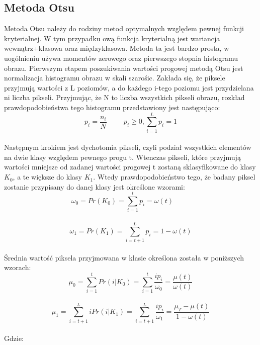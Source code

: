 \documentclass[eng,oneside]{mgr}
\begin{document}
\subsection{Metoda Otsu}
Metoda Otsu należy do rodziny metod optymalnych względem pewnej funkcji kryterialnej. W tym przypadku ową funkcja kryterialną jest wariancja wewnątrz+klasowa oraz międzyklasowa. Metoda ta jest bardzo prosta, w uogólnieniu używa momentów zerowego oraz pierwszego stopnia histogramu obrazu.
Pierwszym etapem poszukiwania wartości progowej metodą Otsu jest normalizacja histogramu obrazu w skali szarośic. Zakłada się, że piksele przyjmują wartości z L poziomów, a do każdego i-tego poziomu jest przydzielana ni liczba pikseli. Przyjmując, że N to liczba wszystkich pikseli obrazu, rozkład prawdopodobieństwa tego histogramu przedstawiony jest następująco:
\\ 
\begin{equation}
 p_i = \frac{n_i}{N} \hspace{1cm}
 p_i \geq 0, \sum_{i=1}^L p_i = 1 
\end{equation}
\\ 
Następnym krokiem jest dychotomia pikseli, czyli podział wszystkich elementów na dwie klasy względem pewnego progu t. Wtenczas pikseli, które przyjmują wartości mniejsze od zadanej wartości progowej t zostaną sklasyfikowane do klasy $K_0$, a te większe do klasy $K_1$. Wtedy prawdopodobieństwo tego, że badany piksel zostanie przypisany do danej klasy jest określone wzorami:
\\
\begin{equation}
\omega_0 = Pr(K_0)=\sum_{i=1}^t p_i = \omega(t)\hspace{1cm}
\end{equation}
\
\begin{equation}
\omega_1 = Pr(K_1)=\sum_{i=t+1}^L p_i = 1 - \omega(t)
\end{equation}
\\
Średnia wartość piksela przyjmowana w klasie określona została w poniższych wzorach:
\\
\begin{equation}
\mu_0=\sum_{i=1}^t Pr(i|K_0)=\sum_{i=1}^t \frac{ip_i}{\omega_0}=\frac{\mu(t)}{\omega(t)}
\end{equation}
\
\begin{equation}
\mu_1=\sum_{i=t+1}^L iPr(i|K_1)=\sum_{i=t+1}^L \frac{ip_i}{\omega_1} = \frac{\mu_T-\mu(t)}{1-\omega(t)}
\end{equation}
\\
Gdzie:
\\
\end{document}
